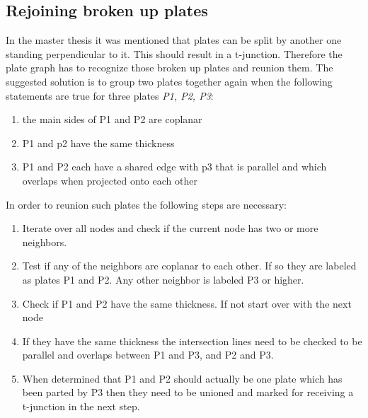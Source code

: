 \documentclass[../ClassicThesis.tex]{subfiles}
\begin{document}
\subsection{Rejoining broken up plates}
In the master thesis \cite{master-thesis} it was mentioned that plates can be split by another one standing perpendicular to it. This should result in a t-junction. Therefore the plate graph has to recognize those broken up plates and reunion them. The suggested solution is to group two plates together again when the following statements are true for three plates \emph{P1, P2, P3}:\\
    \begin{enumerate}
        \item the main sides of P1 and P2 are coplanar
        \item P1 and p2 have the same thickness
        \item P1 and P2 each have a shared edge with p3 that is parallel and which overlaps when projected onto each other
    \end{enumerate}
    In order to reunion such plates the following steps are necessary:
    \begin{enumerate}
        \item Iterate over all nodes and check if the current node has two or more neighbors. 
        \item Test if any of the neighbors are coplanar to each other. If so they are labeled as plates P1 and P2. Any other neighbor is labeled P3 or higher.
        \item Check if P1 and P2 have the same thickness. If not start over with the next node
        \item If they have the same thickness the intersection lines need to be checked to be parallel and overlaps between P1 and P3, and P2 and P3.
        \item When determined that P1 and P2 should actually be one plate which has been parted by P3 then they need to be unioned and marked for receiving a t-junction in the next step.
    \end{enumerate}






\end{document}
